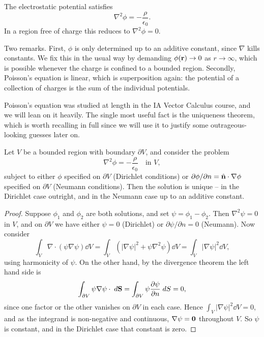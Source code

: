 \documentclass[a4paper]{scrartcl}
\newcommand{\hh}[1]{\hat{\vv{#1}}}
\begin{document}
\begin{proposition}
	The electrostatic potential satisfies
	$$
	\nabla^2 \phi = -\frac{\rho}{\epsilon_0}.
	$$
	In a region free of charge this reduces to  $\nabla^2 \phi = 0$.
\end{proposition}

Two remarks. First, $\phi$ is only determined up to an additive constant, since $\nabla$ kills constants. We fix this in the usual way by demanding $\phi(\mathbf{r}) \to 0$ as $r \to \infty$, which is possible whenever the charge is confined to a bounded region. Secondly, Poisson's equation is linear, which is superposition again: the potential of a collection of charges is the sum of the individual potentials.

Poisson's equation was studied at length in the IA Vector Calculus course, and we will lean on it heavily. The single most useful fact is the uniqueness theorem, which is worth recalling in full since we will use it to justify some outrageous-looking guesses later on.

\begin{theorem}
	\label{thm:uniqueness}
	Let $V$ be a bounded region with boundary $\partial V$, and consider the problem
	$$
	\nabla^2 \phi = -\frac{\rho}{\epsilon_0} \quad \text{in } V,
	$$
	subject to either $\phi$ specified on $\partial V$ (Dirichlet conditions) or $\partial \phi/\partial n = \hh{n}\cdot\nabla\phi$ specified on $\partial V$ (Neumann conditions). Then the solution is unique -- in the Dirichlet case outright, and in the Neumann case up to an additive constant.
\end{theorem}
\begin{proof}
	Suppose $\phi_1$ and $\phi_2$ are both solutions, and set $\psi = \phi_1 - \phi_2$. Then $\nabla^2 \psi = 0$ in $V$, and on $\partial V$ we have either $\psi = 0$ (Dirichlet) or $\partial \psi/\partial n = 0$ (Neumann). Now consider
	$$
	\int_V \nabla\cdot(\psi \nabla \psi)\dd V = \int_V \left(|\nabla \psi|^2 + \psi \nabla^2 \psi\right)\dd V = \int_V |\nabla\psi|^2 \dd V,
	$$
	using harmonicity of $\psi$. On the other hand, by the divergence theorem the left hand side is
	$$
	\int_{\partial V} \psi \nabla \psi \cdot \; d \mathbf{S} = \int_{\partial V}\psi \frac{\partial \psi}{\partial n}\; d S = 0,
	$$
	since one factor or the other vanishes on $\partial V$ in each case. Hence $\int_V |\nabla\psi|^2 \dd V = 0$, and as the integrand is non-negative and continuous, $\nabla \psi = \mathbf{0}$ throughout $V$. So $\psi$ is constant, and in the Dirichlet case that constant is zero.
\end{proof}
\end{document}
